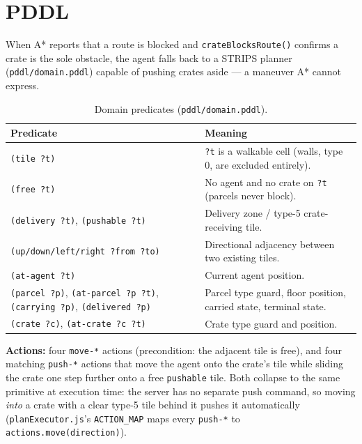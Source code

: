\documentclass[11pt,a4paper]{article}
\begin{document}
\section{PDDL}
\label{sec:pddl}

When A* reports that a route is blocked and \texttt{crateBlocksRoute()} confirms a crate is the
sole obstacle, the agent falls back to a STRIPS planner (\texttt{pddl/domain.pddl}) capable of
pushing crates aside --- a maneuver A* cannot express.

\begin{table}[htbp]
\centering
\footnotesize
\begin{tabular}{@{}p{3.4cm}p{8.6cm}@{}}
\toprule
\textbf{Predicate} & \textbf{Meaning} \\
\midrule
\texttt{(tile ?t)} & \texttt{?t} is a walkable cell (walls, type 0, are excluded entirely). \\
\texttt{(free ?t)} & No agent and no crate on \texttt{?t} (parcels never block). \\
\texttt{(delivery ?t)}, \texttt{(pushable ?t)} & Delivery zone / type-5 crate-receiving tile. \\
\texttt{(up/down/left/right ?from ?to)} & Directional adjacency between two existing tiles. \\
\texttt{(at-agent ?t)} & Current agent position. \\
\texttt{(parcel ?p)}, \texttt{(at-parcel ?p ?t)}, \texttt{(carrying ?p)}, \texttt{(delivered ?p)} & Parcel type guard, floor position, carried state, terminal state. \\
\texttt{(crate ?c)}, \texttt{(at-crate ?c ?t)} & Crate type guard and position. \\
\bottomrule
\end{tabular}
\caption{Domain predicates (\texttt{pddl/domain.pddl}).}
\label{tab:pddl-predicates}
\end{table}

\textbf{Actions:} four \texttt{move-*} actions (precondition: the adjacent tile is free), and
four matching \texttt{push-*} actions that move the agent onto the crate's tile while sliding the
crate one step further onto a free \texttt{pushable} tile. Both collapse to the same primitive at
execution time: the server has no separate push command, so moving \emph{into} a crate with a
clear type-5 tile behind it pushes it automatically (\texttt{planExecutor.js}'s
\texttt{ACTION\_MAP} maps every \texttt{push-*} to \texttt{actions.move(direction)}).
\end{document}
